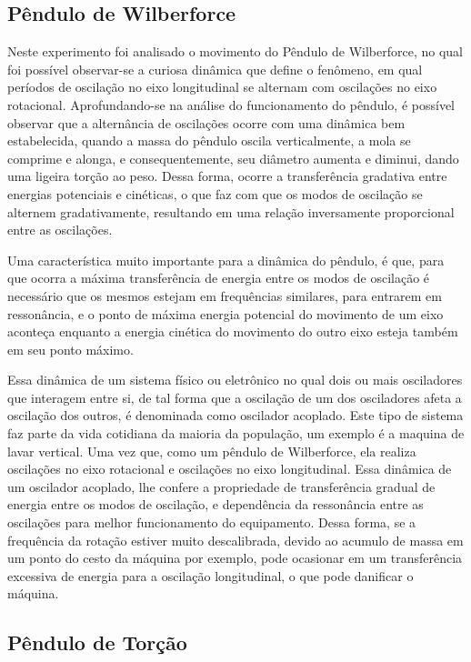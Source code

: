 \subsection{Pêndulo de Wilberforce}
Neste experimento foi analisado o movimento do Pêndulo de Wilberforce, no qual foi possível observar-se a curiosa dinâmica que define o fenômeno,
em qual períodos de oscilação no eixo longitudinal se alternam com oscilações no eixo rotacional. Aprofundando-se na análise 
do funcionamento do pêndulo, é possível observar que a alternância de oscilações ocorre com uma dinâmica bem estabelecida, 
quando a massa do pêndulo oscila verticalmente, a mola se comprime e alonga, e consequentemente, seu diâmetro aumenta e diminui,
dando uma ligeira torção ao peso. Dessa forma, ocorre a transferência gradativa entre energias potenciais e cinéticas, o que
faz com que os modos de oscilação se alternem gradativamente, resultando em uma relação inversamente proporcional entre as oscilações.

Uma característica muito importante para a dinâmica do pêndulo, é que, para que ocorra a máxima transferência de energia entre os modos
de oscilação é necessário que os mesmos estejam em frequências similares, para entrarem em ressonância, e o ponto de máxima energia potencial
do movimento de um eixo aconteça enquanto a energia cinética do movimento do outro eixo esteja também em seu ponto máximo.

Essa dinâmica de um sistema físico ou eletrônico no qual dois ou mais osciladores que interagem entre si, de tal forma que a oscilação de 
um dos osciladores afeta a oscilação dos outros, é denominada como oscilador acoplado. Este tipo de sistema faz parte da vida cotidiana da maioria da 
população, um exemplo é a maquina de lavar vertical. Uma vez que, como um pêndulo de Wilberforce, ela realiza oscilações no 
eixo rotacional e oscilações no eixo longitudinal. Essa dinâmica de um oscilador acoplado, lhe confere a propriedade de transferência 
gradual de energia entre os modos de oscilação, e dependência da ressonância entre as oscilações para melhor funcionamento do equipamento.
Dessa forma, se a frequência da rotação estiver muito descalibrada, devido ao acumulo de massa em um ponto do cesto da máquina por exemplo,
pode ocasionar em um transferência excessiva de energia para a oscilação longitudinal, o que pode danificar o máquina.

\subsection{Pêndulo de Torção}  


